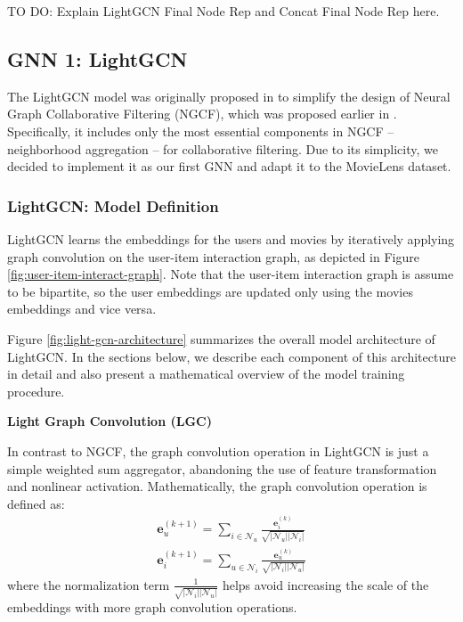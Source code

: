 \documentclass{article}
\begin{document}
TO DO: Explain LightGCN Final Node Rep and Concat Final Node Rep here.

\subsection{GNN 1: LightGCN}

The LightGCN model was originally proposed in \cite{lightgcn} to simplify the design of Neural Graph Collaborative Filtering (NGCF), which was proposed earlier in \cite{ngcf}. Specifically, it includes only the most essential components in NGCF -- neighborhood aggregation -- for collaborative filtering. Due to its simplicity, we decided to implement it as our first GNN and adapt it to the MovieLens dataset.

\subsubsection{LightGCN: Model Definition}

LightGCN learns the embeddings for the users and movies by iteratively applying graph convolution on the user-item interaction graph, as depicted in Figure \ref{fig:user-item-interact-graph}. Note that the user-item interaction graph is assume to be bipartite, so the user embeddings are updated only using the movies embeddings and vice versa.

Figure \ref{fig:light-gcn-architecture} summarizes the overall model architecture of LightGCN. In the sections below, we describe each component of this architecture in detail and also present a mathematical overview of the model training procedure.

\textbf{Light Graph Convolution (LGC)}

In contrast to NGCF, the graph convolution operation in LightGCN is just a simple weighted sum aggregator, abandoning the use of feature transformation and nonlinear activation. Mathematically, the graph convolution operation is defined as:
\begin{align*}
    \mathbf{e}_u^{(k+1)} = \sum_{i \in \mathcal{N}_u} \frac{\mathbf{e}_i^{(k)}}{\sqrt{| \mathcal{N}_u | | \mathcal{N}_i | }} \\
    \mathbf{e}_i^{(k+1)} = \sum_{u \in \mathcal{N}_i} \frac{\mathbf{e}_u^{(k)}}{\sqrt{| \mathcal{N}_i | | \mathcal{N}_u | }}
\end{align*}
where the normalization term $\frac{1}{\sqrt{|\mathcal{N}_i| |\mathcal{N}_u|}}$ helps avoid increasing the scale of the embeddings with more graph convolution operations. \cite{lightgcn}
\end{document}
